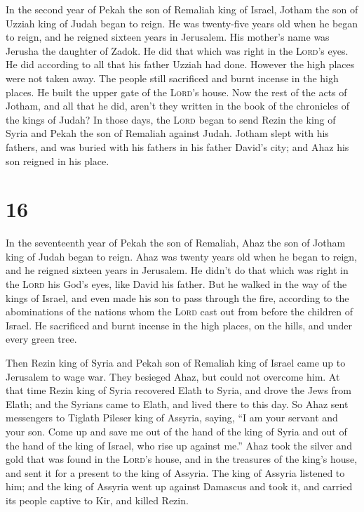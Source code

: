  In the second year of Pekah the son of Remaliah king of
Israel, Jotham the son of Uzziah king of Judah began to reign.
 He was twenty-five years old when he began to reign, and
he reigned sixteen years in Jerusalem. His mother's name was Jerusha the
daughter of Zadok.  He did that which was right in the
\textsc{Lord}'s eyes. He did according to all that his father Uzziah had
done.  However the high places were not taken away. The
people still sacrificed and burnt incense in the high places. He built
the upper gate of the \textsc{Lord}'s house.  Now the
rest of the acts of Jotham, and all that he did, aren't they written in
the book of the chronicles of the kings of Judah?  In
those days, the \textsc{Lord} began to send Rezin the king of Syria and
Pekah the son of Remaliah against Judah.  Jotham slept
with his fathers, and was buried with his fathers in his father David's
city; and Ahaz his son reigned in his place.

\hypertarget{section-15}{%
\section{16}\label{section-15}}

 In the seventeenth year of Pekah the son of Remaliah,
Ahaz the son of Jotham king of Judah began to reign.  Ahaz
was twenty years old when he began to reign, and he reigned sixteen
years in Jerusalem. He didn't do that which was right in the
\textsc{Lord} his God's eyes, like David his father.  But
he walked in the way of the kings of Israel, and even made his son to
pass through the fire, according to the abominations of the nations whom
the \textsc{Lord} cast out from before the children of Israel.
 He sacrificed and burnt incense in the high places, on
the hills, and under every green tree.

 Then Rezin king of Syria and Pekah son of Remaliah king
of Israel came up to Jerusalem to wage war. They besieged Ahaz, but
could not overcome him.  At that time Rezin king of Syria
recovered Elath to Syria, and drove the Jews from Elath; and the Syrians
came to Elath, and lived there to this day.  So Ahaz sent
messengers to Tiglath Pileser king of Assyria, saying, ``I am your
servant and your son. Come up and save me out of the hand of the king of
Syria and out of the hand of the king of Israel, who rise up against
me.''  Ahaz took the silver and gold that was found in the
\textsc{Lord}'s house, and in the treasures of the king's house, and
sent it for a present to the king of Assyria.  The king of
Assyria listened to him; and the king of Assyria went up against
Damascus and took it, and carried its people captive to Kir, and killed
Rezin.

